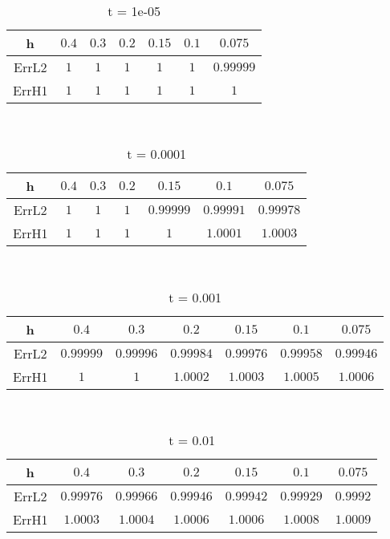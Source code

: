 \documentclass{standalone}
\begin{document}
\clearpage
\hfill \\ 
\begin{table}[!h]
\centering
\begin{tabular}{ | c | c | c | c | c | c | c | }
\hline
h	&	$0.4$ & $0.3$ & $0.2$ & $0.15$ & $0.1$ & $0.075$ \\ \hline
ErrL2	&	$1$ & $1$ & $1$ & $1$ & $1$ & $0.99999$ \\ \hline
ErrH1	&	$1$ & $1$ & $1$ & $1$ & $1$ & $1$ \\ \hline
\end{tabular}
\caption{t = 1e-05 }
\end{table}

\hfill \\ 
\begin{table}[!h]
\centering
\begin{tabular}{ | c | c | c | c | c | c | c | }
\hline
h	&	$0.4$ & $0.3$ & $0.2$ & $0.15$ & $0.1$ & $0.075$ \\ \hline
ErrL2	&	$1$ & $1$ & $1$ & $0.99999$ & $0.99991$ & $0.99978$ \\ \hline
ErrH1	&	$1$ & $1$ & $1$ & $1$ & $1.0001$ & $1.0003$ \\ \hline
\end{tabular}
\caption{t = 0.0001 }
\end{table}

\hfill \\ 
\begin{table}[!h]
\centering
\begin{tabular}{ | c | c | c | c | c | c | c | }
\hline
h	&	$0.4$ & $0.3$ & $0.2$ & $0.15$ & $0.1$ & $0.075$ \\ \hline
ErrL2	&	$0.99999$ & $0.99996$ & $0.99984$ & $0.99976$ & $0.99958$ & $0.99946$ \\ \hline
ErrH1	&	$1$ & $1$ & $1.0002$ & $1.0003$ & $1.0005$ & $1.0006$ \\ \hline
\end{tabular}
\caption{t = 0.001 }
\end{table}

\hfill \\ 
\begin{table}[!h]
\centering
\begin{tabular}{ | c | c | c | c | c | c | c | }
\hline
h	&	$0.4$ & $0.3$ & $0.2$ & $0.15$ & $0.1$ & $0.075$ \\ \hline
ErrL2	&	$0.99976$ & $0.99966$ & $0.99946$ & $0.99942$ & $0.99929$ & $0.9992$ \\ \hline
ErrH1	&	$1.0003$ & $1.0004$ & $1.0006$ & $1.0006$ & $1.0008$ & $1.0009$ \\ \hline
\end{tabular}
\caption{t = 0.01 }
\end{table}


\clearpage
\end{document}
